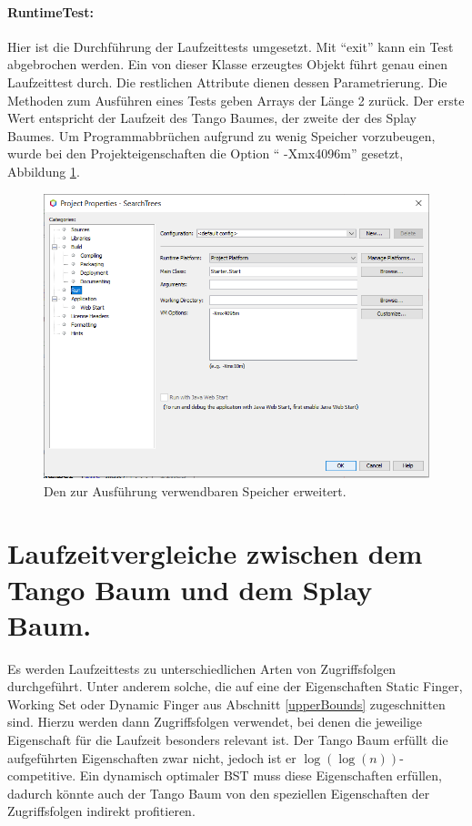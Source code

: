 \documentclass[a4paper,12pt]{article}
\begin{document}
\paragraph{RuntimeTest:}
Hier ist die Durchführung der Laufzeittests umgesetzt. Mit \enquote{exit} kann ein Test abgebrochen werden. Ein von dieser Klasse erzeugtes Objekt führt genau einen Laufzeittest durch. Die restlichen Attribute dienen dessen Parametrierung. Die Methoden zum Ausführen eines Tests  geben Arrays der Länge 2 zurück. Der erste Wert entspricht der Laufzeit des Tango Baumes, der zweite der des Splay Baumes. Um Programmabbrüchen aufgrund zu wenig Speicher vorzubeugen, wurde bei den Projekteigenschaften die Option \enquote{ -Xmx4096m} gesetzt, Abbildung \ref{fig:optionSpeicher}.
\begin{figure}[H]
	\centering
	\includegraphics[width=1\textwidth]{Medien/laufzeittest/optionSpeicher}
	\caption{Den zur Ausführung verwendbaren Speicher erweitert.}
	\label{fig:optionSpeicher}
\end{figure}


\section {Laufzeitvergleiche zwischen dem Tango Baum und dem Splay Baum.}

Es werden Laufzeittests zu unterschiedlichen Arten von Zugriffsfolgen durchgeführt. Unter anderem solche, die auf eine der Eigenschaften  Static Finger,  Working Set oder Dynamic Finger aus Abschnitt \ref{upperBounds} zugeschnitten sind. Hierzu werden dann Zugriffsfolgen verwendet, bei denen die jeweilige Eigenschaft für die Laufzeit besonders relevant ist. Der Tango Baum erfüllt die aufgeführten Eigenschaften zwar nicht, jedoch ist er  $\log\left(\log\left(n\right)\right)$-competitive. Ein dynamisch optimaler BST muss diese Eigenschaften erfüllen, dadurch könnte auch der Tango Baum von den speziellen Eigenschaften der Zugriffsfolgen indirekt profitieren.  \\
\end{document}
